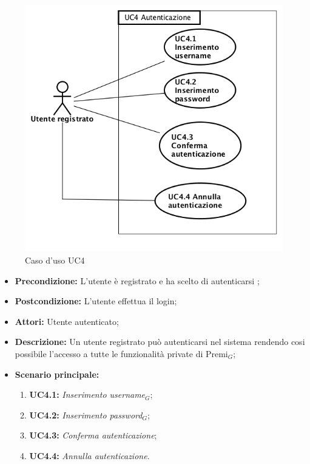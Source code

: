 \begin{figure}[h]
	\begin{center}
	\includegraphics[scale=0.5]{diagram/UC4.png}
	\caption{Caso d'uso UC4}
	\end{center}
\end{figure}
\begin{itemize}
	\item \textbf{Precondizione:} L'utente è registrato e ha scelto di autenticarsi ;
	\item \textbf{Postcondizione:} L'utente effettua il login;
	\item \textbf{Attori:} Utente autenticato;
	\item \textbf{Descrizione:} Un utente registrato può autenticarsi nel sistema rendendo cosi possibile l'accesso a tutte le funzionalità private di Premi$_G$;
	\item \textbf{Scenario principale:}
	\begin{enumerate}
		\item \textbf{ UC4.1:} \textit{ Inserimento username$_G$};
		\item \textbf{ UC4.2:} \textit{ Inserimento password$_G$};
		\item \textbf{ UC4.3:} \textit{ Conferma autenticazione};
		\item \textbf{ UC4.4:} \textit{ Annulla autenticazione}.
	\end{enumerate}
\end{itemize}
